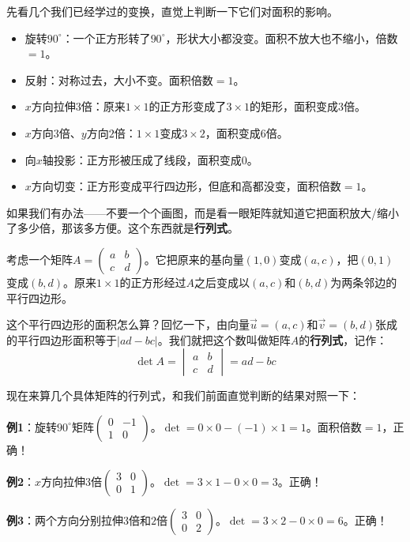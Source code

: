 \documentclass[a4paper,12pt]{ctexart}
\begin{document}
先看几个我们已经学过的变换，直觉上判断一下它们对面积的影响。
\begin{itemize}
\item 旋转$90^\circ$：一个正方形转了$90^\circ$，形状大小都没变。面积不放大也不缩小，倍数$=1$。
\item 反射：对称过去，大小不变。面积倍数$=1$。
\item $x$方向拉伸$3$倍：原来$1\times1$的正方形变成了$3\times1$的矩形，面积变成$3$倍。
\item $x$方向$3$倍、$y$方向$2$倍：$1\times1$变成$3\times2$，面积变成$6$倍。
\item 向$x$轴投影：正方形被压成了线段，面积变成$0$。
\item $x$方向切变：正方形变成平行四边形，但底和高都没变，面积倍数$=1$。
\end{itemize}

如果我们有办法——不要一个个画图，而是看一眼矩阵就知道它把面积放大/缩小了多少倍，那该多方便。这个东西就是\textbf{行列式}。


考虑一个矩阵$A=\begin{pmatrix}a&b\\c&d\end{pmatrix}$。它把原来的基向量$(1,0)$变成$(a,c)$，把$(0,1)$变成$(b,d)$。原来$1\times1$的正方形经过$A$之后变成以$(a,c)$和$(b,d)$为两条邻边的平行四边形。

这个平行四边形的面积怎么算？回忆一下，由向量$\vec u=(a,c)$和$\vec v=(b,d)$张成的平行四边形面积等于$|ad-bc|$。我们就把这个数叫做矩阵$A$的\textbf{行列式}，记作：
\[
\det A = \begin{vmatrix}a&b\\c&d\end{vmatrix} = ad-bc
\]

现在来算几个具体矩阵的行列式，和我们前面直觉判断的结果对照一下：

\textbf{例1}：旋转$90^\circ$矩阵$\begin{pmatrix}0&-1\\1&0\end{pmatrix}$。$\det=0\times0-(-1)\times1=1$。面积倍数$=1$，正确！

\textbf{例2}：$x$方向拉伸$3$倍$\begin{pmatrix}3&0\\0&1\end{pmatrix}$。$\det=3\times1-0\times0=3$。正确！

\textbf{例3}：两个方向分别拉伸$3$倍和$2$倍$\begin{pmatrix}3&0\\0&2\end{pmatrix}$。$\det=3\times2-0\times0=6$。正确！
\end{document}
